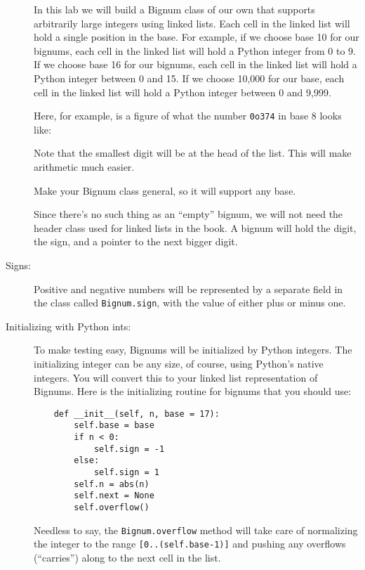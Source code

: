 \documentclass{article}
\begin{document}
\begin{description}
In this lab we will build a Bignum class of our own that supports arbitrarily large integers
using linked lists.  Each cell in the linked list will hold a single position in
the base.  For example, if we choose base 10 for our bignums, each
cell in the linked list will hold a Python integer from 0 to 9.  If we choose
base 16 for our bignums, each cell in the linked list will hold a 
Python integer between 0 and 15.  If we choose 10,000 for our base,
each cell in the linked list will hold a Python integer between 0 and 9,999.

Here, for example, is a figure of what the number \lstinline{0o374} in base 8
looks like:

\begin{center}
\end{center}

Note that the smallest digit will be at the head of the list.  This will make arithmetic
much easier.

Make your Bignum class general, so it will support any base.  

Since there's no such thing as an ``empty'' bignum, we will not need the header
class used for linked lists in the book.  A bignum will hold the digit, the sign, and a 
pointer to the next bigger digit.

\item[Signs:]  Positive and negative numbers will be represented by
a separate field in the class called \lstinline{Bignum.sign}, with the value
of either plus or minus one.

\item[Initializing with Python ints:]  To make testing easy, Bignums will be initialized
by Python integers.  The initializing integer can be any size, of course,
using Python's native integers.  You will convert this to your linked list
representation of Bignums.  Here is the initializing routine for bignums
that you should use:
\begin{lstlisting}
    def __init__(self, n, base = 17):
        self.base = base
        if n < 0:
            self.sign = -1
        else:
            self.sign = 1
        self.n = abs(n)
        self.next = None
        self.overflow()
\end{lstlisting}
Needless to say, the \lstinline{Bignum.overflow} method will take care of
normalizing the integer to the range \lstinline{[0..(self.base-1)]} and
pushing any overflows (``carries'') along to the next cell in the list.


\end{description}
\end{document}
